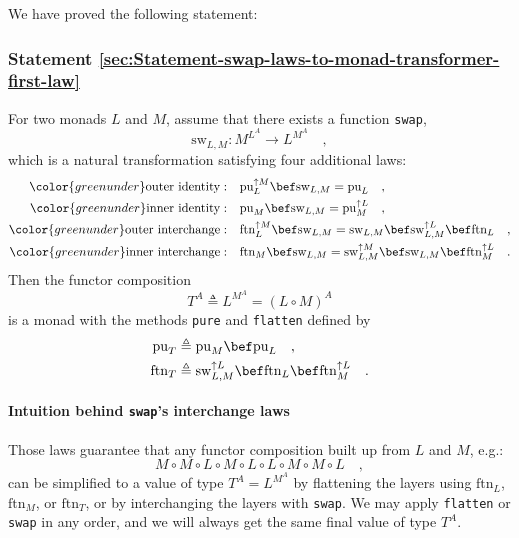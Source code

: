 We have proved the following statement:

\subsubsection{Statement \label{sec:Statement-swap-laws-to-monad-transformer-first-law}\ref{sec:Statement-swap-laws-to-monad-transformer-first-law}}

For two monads $L$ and $M$, assume that there exists a function
\lstinline!swap!,
\[
\text{sw}_{L,M}:M^{L^{A}}\rightarrow L^{M^{A}}\quad,
\]
which is a natural transformation satisfying four additional laws:
\begin{align*}
{\color{greenunder}\text{outer identity}:}\quad & \text{pu}_{L}^{\uparrow M}\bef\text{sw}_{L,M}=\text{pu}_{L}\quad,\\
{\color{greenunder}\text{inner identity}:}\quad & \text{pu}_{M}\bef\text{sw}_{L,M}=\text{pu}_{M}^{\uparrow L}\quad,\\
{\color{greenunder}\text{outer interchange}:}\quad & \text{ftn}_{L}^{\uparrow M}\bef\text{sw}_{L,M}=\text{sw}_{L,M}\bef\text{sw}_{L,M}^{\uparrow L}\bef\text{ftn}_{L}\quad,\\
{\color{greenunder}\text{inner interchange}:}\quad & \text{ftn}_{M}\bef\text{sw}_{L,M}=\text{sw}_{L,M}^{\uparrow M}\bef\text{sw}_{L,M}\bef\text{ftn}_{M}^{\uparrow L}\quad.
\end{align*}
Then the functor composition
\[
T^{A}\triangleq L^{M^{A}}=\left(L\circ M\right)^{A}
\]
is a monad with the methods \lstinline!pure! and \lstinline!flatten!
defined by
\begin{align}
\text{pu}_{T} & \triangleq\text{pu}_{M}\bef\text{pu}_{L}\quad,\label{eq:def-pure-T-via-pure-L-and-pure-M}\\
\text{ftn}_{T} & \triangleq\text{sw}_{L,M}^{\uparrow L}\bef\text{ftn}_{L}\bef\text{ftn}_{M}^{\uparrow L}\quad.\label{eq:def-flatten-T-via-sw-and-flatten-L-M}
\end{align}


\paragraph{Intuition behind \texttt{swap}\textsf{'}s interchange laws}

Those laws guarantee that any functor composition built up from $L$
and $M$, e.g.:
\[
M\circ M\circ L\circ M\circ L\circ L\circ M\circ M\circ L\quad,
\]
can be simplified to a value of type $T^{A}=L^{M^{A}}$ by flattening
the layers using $\text{ftn}_{L}$, $\text{ftn}_{M}$, or $\text{ftn}_{T}$,
or by interchanging the layers with \lstinline!swap!. We may apply
\lstinline!flatten! or \lstinline!swap! in any order, and we will
always get the same final value of type $T^{A}$.

